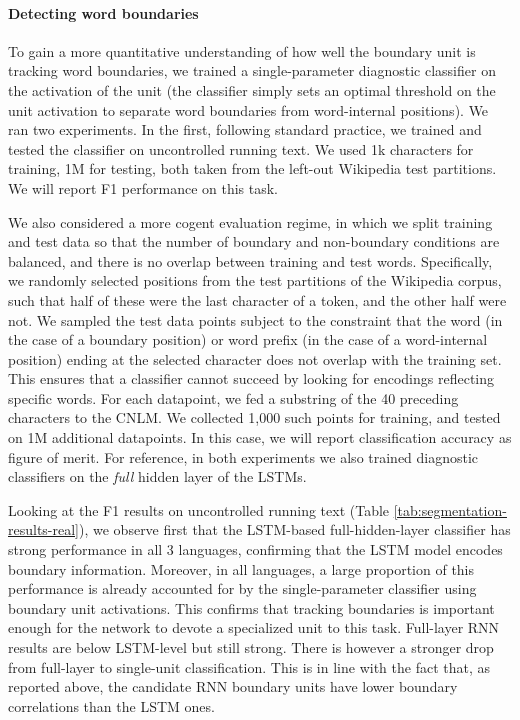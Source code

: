 \paragraph{Detecting word boundaries} To gain a more quantitative
understanding of how well the boundary unit is tracking word
boundaries, we trained a single-parameter diagnostic classifier on the
activation of the unit (the classifier simply sets an optimal
threshold on the unit activation to separate word boundaries from
word-internal positions). We ran two experiments. In the first,
following standard practice, we trained and tested the classifier on
uncontrolled running text. We used 1k characters for training, 1M for
testing, both taken from the left-out Wikipedia test partitions. We
will report F1 performance on this task.

We also considered a more cogent evaluation regime, in which we split
training and test data so that the number of boundary and non-boundary
conditions are balanced, and there is no overlap between training and
test words. Specifically, we randomly selected positions from the test
partitions of the Wikipedia corpus, such that half of these were the
last character of a token, and the other half were not.  %
We sampled the test data points subject to the constraint that the
word (in the case of a boundary position) or word prefix (in the case
of a word-internal position) ending at the selected character does not
overlap with the training set. This ensures that a classifier cannot
succeed by looking for encodings reflecting specific words.  For each
datapoint, we fed a substring of the 40 preceding characters to the
CNLM. %
We collected 1,000 such points for training, and tested on 1M additional datapoints. In this
case, we will report classification accuracy as figure of merit.
For reference, in both experiments we also trained diagnostic
classifiers on the \emph{full} hidden layer of the LSTMs.

Looking at the F1 results on uncontrolled running text (Table
\ref{tab:segmentation-results-real}), we observe first that the
LSTM-based full-hidden-layer classifier has strong performance in all
3 languages, confirming that the LSTM model encodes boundary
information.  Moreover, in all languages, a large proportion of this
performance is already accounted for by the single-parameter
classifier using boundary unit activations. This confirms that
tracking boundaries is important enough for the network to devote a
specialized unit to this task. Full-layer RNN results are below
LSTM-level but still strong. There is however a
stronger drop from full-layer to single-unit classification. This is in
line with the fact that, as reported above, the candidate RNN boundary units have lower
boundary correlations than the LSTM ones.

